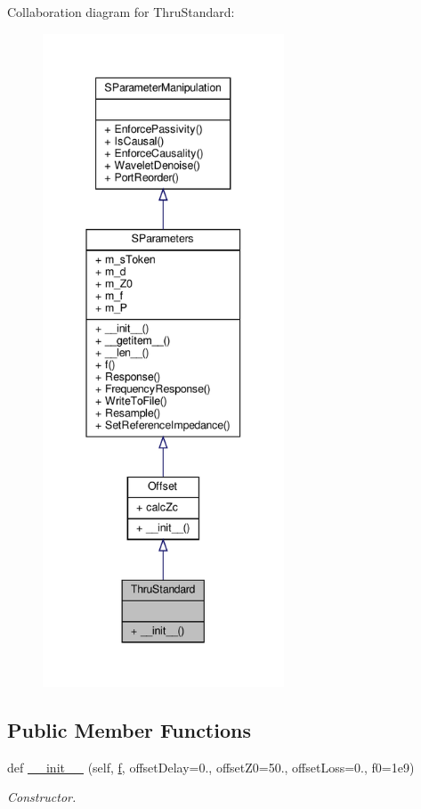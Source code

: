 Collaboration diagram for Thru\+Standard\+:
\nopagebreak
\begin{figure}[H]
\begin{center}
\leavevmode
\includegraphics[height=550pt]{classSignalIntegrity_1_1Measurement_1_1CalKit_1_1Standards_1_1ThruStandard_1_1ThruStandard__coll__graph}
\end{center}
\end{figure}
\subsection*{Public Member Functions}
\begin{DoxyCompactItemize}
\item 
def \hyperlink{classSignalIntegrity_1_1Measurement_1_1CalKit_1_1Standards_1_1ThruStandard_1_1ThruStandard_ad0a85daa668eb31179a32ff9d6235020}{\+\_\+\+\_\+init\+\_\+\+\_\+} (self, \hyperlink{classSignalIntegrity_1_1SParameters_1_1SParameters_1_1SParameters_a32e7a34d6837fe949b413c852a0447f8}{f}, offset\+Delay=0., offset\+Z0=50., offset\+Loss=0., f0=1e9)
\begin{DoxyCompactList}\small\item\em Constructor. \end{DoxyCompactList}\end{DoxyCompactItemize}


